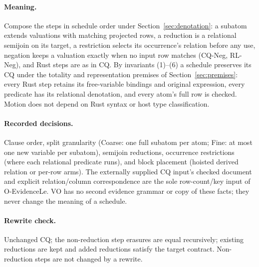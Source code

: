 \paragraph{Meaning.} Compose the steps in schedule order under
Section~\ref{sec:denotation}: a subatom extends valuations with matching
projected rows, a reduction is a relational semijoin on its target, a
restriction selects its occurrence's relation before any use, negation
keeps a valuation exactly when no input row matches (CQ-Neg, RL-Neg), and Rust
steps are as in CQ. By invariants (1)--(6) a schedule preserves its CQ under
the totality and representation premises of Section~\ref{sec:premises}:
every Rust step retains its free-variable bindings and original expression,
every predicate has its relational denotation, and every atom's full row is
checked. Motion does not depend on Rust syntax or host type classification.

\paragraph{Recorded decisions.} Clause order, split granularity (Coarse: one full
subatom per atom; Fine: at most one new variable per subatom), semijoin
reductions, occurrence restrictions (where each relational predicate runs),
and block placement (hoisted
derived relation or per-row arms).
The externally supplied CQ input's checked  document
and explicit relation/column correspondence are the sole row-count/key input
of O-EvidenceLe. VO has no second evidence grammar or copy of these facts;
they never change the meaning of a schedule.

\paragraph{Rewrite check.} Unchanged CQ; the non-reduction step erasures are equal
recursively; existing reductions are kept and added reductions satisfy the
target contract. Non-reduction steps are not
changed by a rewrite.
